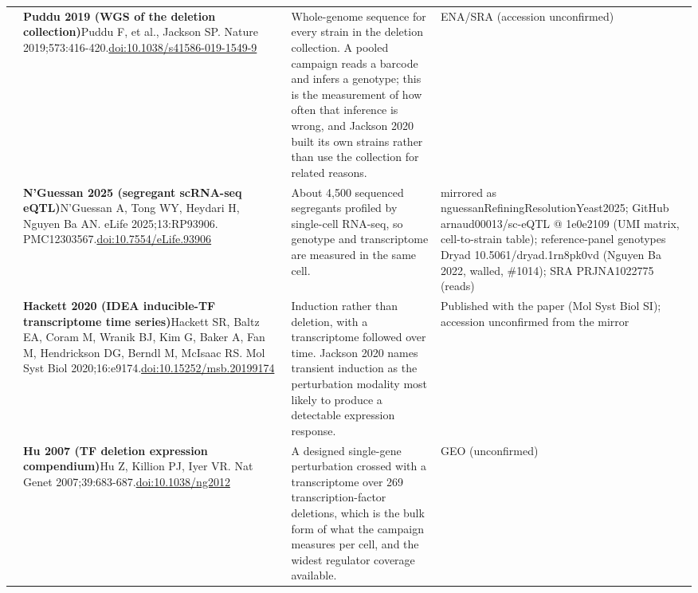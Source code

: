 \begin{landscape}
\begin{longtable}{@{}r@{\hspace{4pt}} L{86mm} L{92mm} L{62mm}@{}}
 & \textbf{Puddu 2019 (WGS of the deletion collection)}\newline Puddu F, et al., Jackson SP. Nature 2019;573:416-420.\newline \href{https://doi.org/10.1038/s41586-019-1549-9}{doi:10.1038/\allowbreak s41586-019-1549-9} & Whole-genome sequence for every strain in the deletion collection. A pooled campaign reads a barcode and infers a genotype; this is the measurement of how often that inference is wrong, and Jackson 2020 built its own strains rather than use the collection for related reasons. & ENA/\allowbreak SRA (accession unconfirmed) \\
 & \textbf{N'Guessan 2025 (segregant scRNA-seq eQTL)}\newline N'Guessan A, Tong WY, Heydari H, Nguyen Ba AN. eLife 2025;13:RP93906. PMC12303567.\newline \href{https://doi.org/10.7554/eLife.93906}{doi:10.7554/\allowbreak eLife.93906} & About 4,500 sequenced segregants profiled by single-cell RNA-seq, so genotype and transcriptome are measured in the same cell. & mirrored as nguessanRefiningResolutionYeast2025; GitHub arnaud00013/\allowbreak sc-eQTL @ 1e0e2109 (UMI matrix, cell-to-strain table); reference-panel genotypes Dryad 10.5061/\allowbreak dryad.1rn8pk0vd (Nguyen Ba 2022, walled, \#1014); SRA PRJNA1022775 (reads) \\
 & \textbf{Hackett 2020 (IDEA inducible-TF transcriptome time series)}\newline Hackett SR, Baltz EA, Coram M, Wranik BJ, Kim G, Baker A, Fan M, Hendrickson DG, Berndl M, McIsaac RS. Mol Syst Biol 2020;16:e9174.\newline \href{https://doi.org/10.15252/msb.20199174}{doi:10.15252/\allowbreak msb.20199174} & Induction rather than deletion, with a transcriptome followed over time. Jackson 2020 names transient induction as the perturbation modality most likely to produce a detectable expression response. & Published with the paper (Mol Syst Biol SI); accession unconfirmed from the mirror \\
 & \textbf{Hu 2007 (TF deletion expression compendium)}\newline Hu Z, Killion PJ, Iyer VR. Nat Genet 2007;39:683-687.\newline \href{https://doi.org/10.1038/ng2012}{doi:10.1038/\allowbreak ng2012} & A designed single-gene perturbation crossed with a transcriptome over 269 transcription-factor deletions, which is the bulk form of what the campaign measures per cell, and the widest regulator coverage available. & GEO (unconfirmed) \\

\end{longtable}
\end{landscape}
